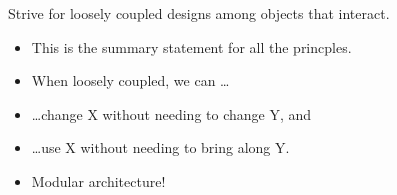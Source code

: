 \documentclass{beamer}
\begin{document}
\begin{frame}{Strive for loosely coupled designs among objects that interact.}
    \begin{itemize}
        \item This is the summary statement for all the princples.
        \item When loosely coupled, we can \ldots
        \item \ldots change X without needing to change Y, and
        \item \ldots use X without needing to bring along Y.
        \item Modular architecture!
    \end{itemize}
\end{frame}
\end{document}
